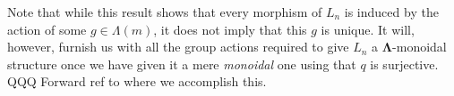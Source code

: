 \documentclass{amsbook} %
\newcommand{\ML}{\mathbf{\Lambda}}
\newcommand{\ELn}{E\Lambda(\underline{n})}
\newcommand{\ELnn}{E\Lambda(\underline{2n})}
\newenvironment{eq*}{\begin{equation*}}{\end{equation*}}
\numberwithin{section}{chapter}
\begin{document}
Note that while this result shows that every morphism of $L_n$ is induced by the action of some $g \in \Lambda(m)$, it does not imply that this $g$ is unique. It will, however, furnish us with all the group actions required to give $L_n$ a $\ML$-monoidal structure once we have given it a mere \emph{monoidal} one using that $q$ is surjective.  QQQ Forward ref to where we accomplish this.

\end{document}
